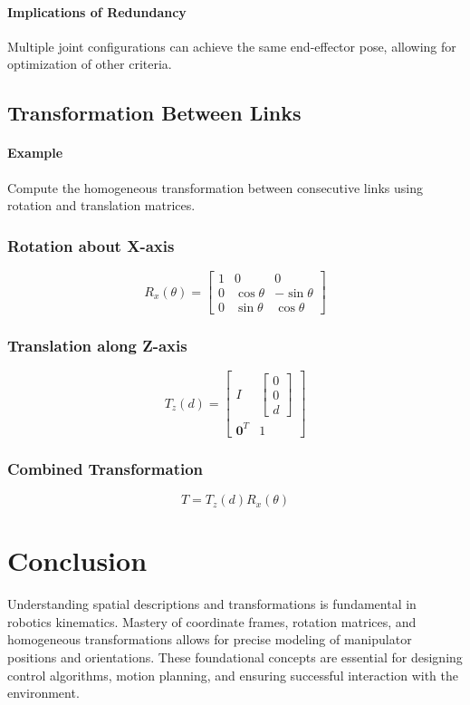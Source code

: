 \documentclass{article}
\begin{document}
\paragraph{Implications of Redundancy}

Multiple joint configurations can achieve the same end-effector pose, allowing for optimization of other criteria.

\subsection{Transformation Between Links}

\paragraph{Example}

Compute the homogeneous transformation between consecutive links using rotation and translation matrices.

\subsubsection{Rotation about X-axis}

$$
R_x(\theta) = \begin{bmatrix}
1 & 0 & 0 \\
0 & \cos\theta & -\sin\theta \\
0 & \sin\theta & \cos\theta
\end{bmatrix}
$$

\subsubsection{Translation along Z-axis}

$$
T_z(d) = \begin{bmatrix}
I & \begin{bmatrix} 0 \\ 0 \\ d \end{bmatrix} \\
\mathbf{0}^T & 1
\end{bmatrix}
$$

\subsubsection{Combined Transformation}

$$
T = T_z(d) R_x(\theta)
$$

\section{Conclusion}

Understanding spatial descriptions and transformations is fundamental in robotics kinematics. Mastery of coordinate frames, rotation matrices, and homogeneous transformations allows for precise modeling of manipulator positions and orientations. These foundational concepts are essential for designing control algorithms, motion planning, and ensuring successful interaction with the environment.
\end{document}
